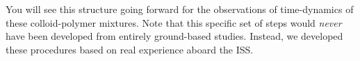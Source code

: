 You will see this structure going forward for the observations of time-dynamics
of these colloid-polymer mixtures. Note that this specific set of steps would
\emph{never} have been developed from entirely ground-based studies. Instead, we
developed these procedures based on real experience aboard the ISS.


